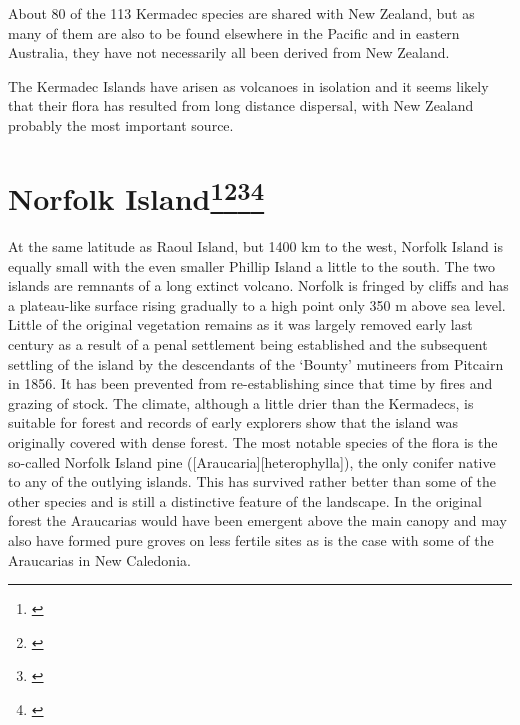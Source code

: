 About 80 of the 113 Kermadec species are shared with New Zealand, but as many of them are also to be found elsewhere in the Pacific and in eastern Australia, they have not necessarily all been derived from New Zealand.

The Kermadec Islands have arisen as volcanoes in isolation and it seems likely that their flora has resulted from long distance dispersal, with New Zealand probably the most important source.

\section[Norfolk Island]{Norfolk Island\footnote{\cite{laing1915revised}}\footnote{\cite{turner1968conservation}}\footnote{\cite{green1970notes}}\footnote{\cite{green1979observations}}}

At the same latitude as Raoul Island, but 1400 km to the west, Norfolk Island is equally small with the even smaller Phillip Island a little to the south.
The two islands are remnants of a long extinct volcano.
Norfolk is fringed by cliffs and has a plateau-like surface rising gradually to a high point only 350 m above sea level.
Little of the original vegetation remains as it was largely removed early last century as a result of a penal settlement being established and the subsequent settling of the island by the descendants of the `Bounty' mutineers from Pitcairn in 1856.
It has been prevented from re-establishing since that time by fires and grazing of stock.
The climate, although a little drier than the Kermadecs, is suitable for forest and records of early explorers show that the island was originally covered with dense forest.
The most notable species of the flora is the so-called Norfolk Island pine ([Araucaria][heterophylla]), the only conifer native to any of the outlying islands.
This has survived rather better than some of the other species and is still a distinctive feature of the landscape.
In the original forest the Araucarias would have been emergent above the main canopy and may also have formed pure groves on less fertile sites as is the case with some of the Araucarias in New Caledonia.


